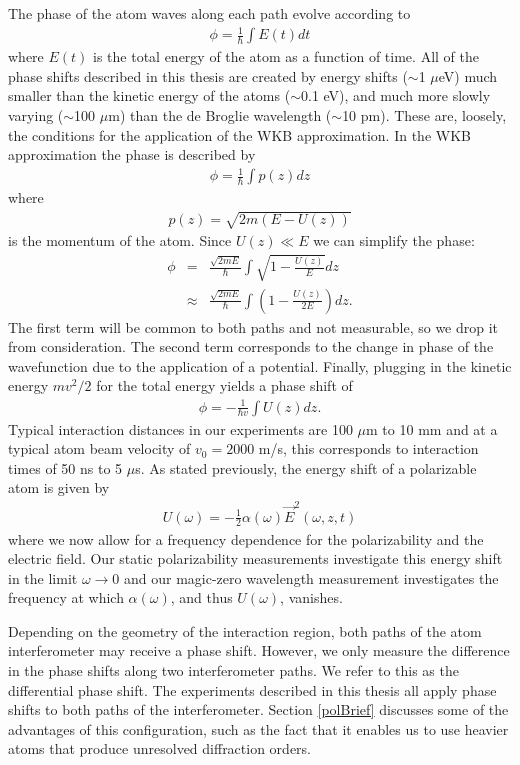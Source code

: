 The phase of the atom waves along each path evolve according to
\begin{eqnarray}
\phi=\frac{1}{\hbar} \int E(t) dt
\end{eqnarray}
where $E(t)$ is the total energy of the atom as a function of time. All of the phase shifts described in this thesis are created by energy shifts ($\sim$1 $\mu$eV) much smaller than the kinetic energy of the atoms ($\sim$0.1 eV), and much more slowly varying ($\sim$100 $\mu$m) than the de Broglie wavelength ($\sim$10 pm). These are, loosely, the conditions for the application of the WKB approximation. In the WKB approximation the phase is described by
\begin{eqnarray}
\phi=\frac{1}{\hbar} \int p(z) dz
\end{eqnarray}
where
\begin{eqnarray}
p(z) = \sqrt{2m(E-U(z))}
\end{eqnarray}
is the momentum of the atom. Since $U(z)\ll E$ we can simplify the phase:
\begin{eqnarray}
\phi &=& \frac{\sqrt{2mE}}{\hbar} \int \sqrt{1-\frac{U(z)}{E}} dz \\
	&\approx& \frac{\sqrt{2mE}}{\hbar} \int \left(1-\frac{U(z)}{2E} \right) dz.
\end{eqnarray}
The first term will be common to both paths and not measurable, so we drop it from consideration. The second term corresponds to the change in phase of the wavefunction due to the application of a potential. Finally, plugging in the kinetic energy $mv^2/2$ for the total energy yields a phase shift of
\begin{eqnarray}
\label{phiUx}
\phi=-\frac{1}{\hbar v} \int U(z) dz.
\end{eqnarray}
Typical interaction distances in our experiments are 100 $\mu$m to 10 mm and at a typical atom beam velocity of $v_0=2000$ m/s, this corresponds to interaction times of 50 ns to 5 $\mu$s. As stated previously, the energy shift of a polarizable atom is given by 
\begin{eqnarray}
U(\omega) = -\frac{1}{2} \alpha(\omega) \vec{E}^2(\omega,z,t)
\end{eqnarray}
where we now allow for a frequency dependence for the polarizability and the electric field. Our static polarizability measurements investigate this energy shift in the limit $\omega \rightarrow 0$ and our magic-zero wavelength measurement investigates the frequency at which $\alpha(\omega)$, and thus $U(\omega)$, vanishes.


Depending on the geometry of the interaction region, both paths of the atom interferometer may receive a phase shift. However, we only measure the difference in the phase shifts along two interferometer paths. We refer to this as the differential phase shift. The experiments described in this thesis all apply phase shifts to both paths of the interferometer. Section \ref{polBrief} discusses some of the advantages of this configuration, such as the fact that it enables us to use heavier atoms that produce unresolved diffraction orders.



